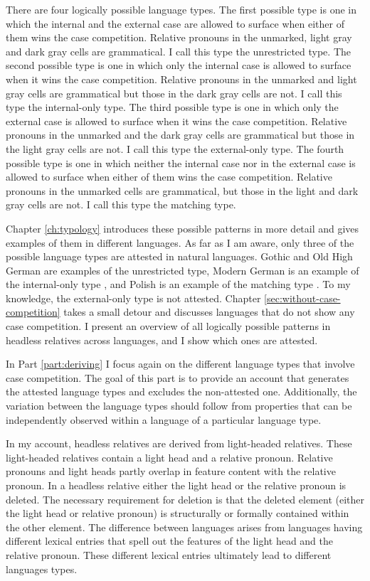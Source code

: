 There are four logically possible language types. The first possible type is one in which the internal and the external case are allowed to surface when either of them wins the case competition. Relative pronouns in the unmarked, light gray and dark gray cells are grammatical. I call this type the unrestricted type. The second possible type is one in which only the internal case is allowed to surface when it wins the case competition. Relative pronouns in the unmarked and light gray cells are grammatical but those in the dark gray cells are not. I call this type the internal-only type. The third possible type is one in which only the external case is allowed to surface when it wins the case competition. Relative pronouns in the unmarked and the dark gray cells are grammatical but those in the light gray cells are not. I call this type the external-only type. The fourth possible type is one in which neither the internal case nor in the external case is allowed to surface when either of them wins the case competition. Relative pronouns in the unmarked cells are grammatical, but those in the light and dark gray cells are not. I call this type the matching type.

Chapter \ref{ch:typology} introduces these possible patterns in more detail and gives examples of them in different languages. As far as I am aware, only three of the possible language types are attested in natural languages. Gothic and Old High German are examples of the unrestricted type, Modern German is an example of the internal-only type \citep{vogel2001}, and Polish is an example of the matching type \citep{citko2013}. To my knowledge, the external-only type is not attested.
Chapter \ref{sec:without-case-competition} takes a small detour and discusses languages that do not show any case competition. I present an overview of all logically possible patterns in headless relatives across languages, and I show which ones are attested.

In Part \ref{part:deriving} I focus again on the different language types that involve case competition. The goal of this part is to provide an account that generates the attested language types and excludes the non-attested one. Additionally, the variation between the language types should follow from properties that can be independently observed within a language of a particular language type.

In my account, headless relatives are derived from light-headed relatives. These light-headed relatives contain a light head and a relative pronoun. Relative pronouns and light heads partly overlap in feature content with the relative pronoun. In a headless relative either the light head or the relative pronoun is deleted. The necessary requirement for deletion is that the deleted element (either the light head or relative pronoun) is structurally or formally contained within the other element.
The difference between languages arises from languages having different lexical entries that spell out the features of the light head and the relative pronoun. These different lexical entries ultimately lead to different languages types.

